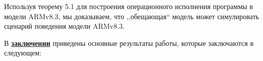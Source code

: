 Используя теорему 5.1 для построения операционного исполнения программы в модели ARMv8.3,
мы доказываем, что ,,обещающая`` модель может симулировать сценарий поведения модели ARMv8.3.



В \underline{\textbf{заключении}} приведены основные результаты работы, которые заключаются в следующем:









